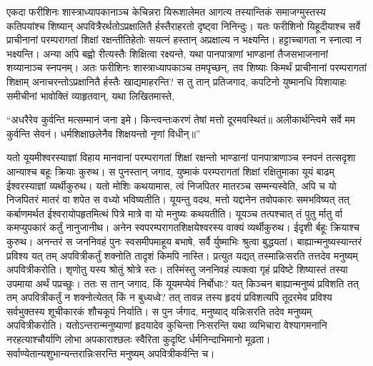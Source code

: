 \adhyAya
{}
\vakya एकदा फरीशिनः शास्त्राध्यापकानाञ्च केचिन्नरा यिरूशालेमत आगत्य
\vakya तस्यान्तिकं समाजग्मुस्तस्य कतिपयांश्च शिष्यान् अपवित्रैरर्थतोऽप्रक्षालितै र्हस्तैराहरतो दृष्ट्वा निनिन्दुः।
\vakya यतः फरीशिनो यिहूदीयाश्च सर्वे प्राचीनानां परम्परागतां शिक्षां रक्षन्तीतिहेतोः सयत्नं हस्तान् अप्रक्षाल्य न भक्ष्यन्ति।
\vakya हट्टाच्चागता न स्नात्वा न भक्ष्यन्ति। अन्या अपि बह्वो रीत्यस्तैः शिक्षित्वा रक्ष्यन्ते, यथा पानपात्राणां भाण्डानां तैजसभाजनानां शय्यानाञ्च स्नपनम्।
\vakya अतः फरीशिनः शास्त्राध्यापकाञ्च तमपृच्छन्, तव शिष्याः किमर्थं प्राचीनानां परम्परागतां शिक्षाम् अनाचरन्तोऽप्रक्षानितै र्हस्तैः खाद्यमाहरन्ति?
\vakya स तु तान् प्रतिजगाद, कपटिनो युष्मानधि यिशायाहः समीचीनां भावोक्तिं व्याहृतवान्, यथा लिखितमास्ते,
\begin{poem}
\startwithline “अधरैरेव कुर्वन्ति मत्सम्मानं जना इमे।
\pline किन्त्वन्तःकरणं तेषां मत्तो दूरमवस्थितं॥
\vakya अलीकार्थन्त्विमे सर्वे मम कुर्वन्ति सेवनं।
\pline धर्मशिक्षाछलेनैव शिक्षयन्तो नृणां विधीन्॥”
\end{poem}
\vakya यतो यूयमीश्वरस्याज्ञां विहाय मानवानां परम्परागतां शिक्षां रक्षन्तो भाण्डानां पानपात्राणाञ्च स्नपनं तत्सदृशा आन्याश्च बहूः क्रियाः कुरुथ।
\vakya स पुनस्तान् जगाद, युष्माकं परम्परागतां शिक्षां रक्षितुमाका यूयं बाढम् ईश्वरस्याज्ञां व्यर्थीकुरुथ।
\vakya यतो मोशिः कथयामास, त्वं निजपितर मातरञ्च सम्मन्यस्वेति, अपि च यो निजपितरं मातरं वा शपेत स वध्यो भविष्यतीति।
\vakya यूयन्तु वदथ, मत्तो यद्दानेन तवोपकारः समभविष्यत् तत् कर्बाणमर्थत ईश्वरायोपहृतमित्थं पित्रे मात्रे वा यो मनुष्यः कथयतीति। यूयञ्च तत्पश्चात् तं पुतु र्मातु र्वा कमप्युपकारं कर्तुं नानुजानीथ।
\vakya अनेन स्वपरम्परागतशिक्षयेश्वरस्य वाक्यं व्यर्थीकुरुथ।
\vakya ईदृशी र्बहूः क्रियाश्च कुरुथ।
\vakya अनन्तरं स जननिवहं पुनः स्वसमीपमाहूय बभाषे, सर्वै र्युष्माभिः श्रुत्वा बुद्धयतां।
\vakya बाह्यान्मनुष्यस्यान्तरं प्रविश्य यत् तम् अपवित्रीकर्तुं शक्नोति तादृशं किमपि नास्ति। प्रत्युत यद्यत् तस्मान्निःसरति तत्तदेव मनुष्यम् अपवित्रीकरोति।
\vakya शृणोतु यस्य श्रोतुं श्रोत्रे स्तः।
\vakya तस्मिंस्तु जननिवहं त्यक्त्वा गृहं प्रविष्टे शिष्यास्तं तस्या उपमाया अर्थं पप्रच्छुः।
\vakya ततः स तान् जगाद, किं यूयमप्येवं निर्बोधाः? यत् किञ्चन बाह्यान्मनुष्यं प्रविशति तत् तम् अपवित्रीकर्तुं न शक्नोत्येतत् किं न बुध्यध्वे?
\vakya तत् तावन्न तस्य हृदयं प्रविशत्यपि तूदरमेव प्रविश्य सर्वभुक्तस्य शूचीकारकं शौचकूपं निर्याति।
\vakya स पुन र्जगाद, मनुष्याद् यन्निःसरति तदेव मनुष्यम् अपवित्रीकरोति।
\vakya यतोऽन्तरान्मनुष्याणां हृदयादेव कुचिन्ता निःसरन्ति यथा व्यभिचारा वेश्यागमनानि नरहत्याश्चौर्याणि
\vakya लोभा अपकाराश्छलः स्वैरिता कुदृष्टि र्धर्मनिन्दाभिमानो मूढता।
\vakya सर्वाण्येतान्यशुभान्यन्तरान्निःसरन्ति मनुष्यम् अपवित्रीकर्वन्ति च।
